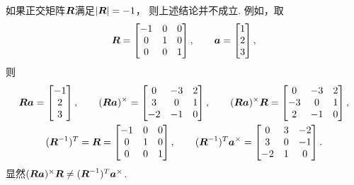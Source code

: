 \begin{remark}
如果正交矩阵\(\boldsymbol{R}\)满足\(\abs{\boldsymbol{R}} = -1\)，
则上述结论并不成立.
例如，取\begin{equation*}
	\boldsymbol{R}
	= \begin{bmatrix}
		-1 & 0 & 0 \\
		0 & 1 & 0 \\
		0 & 0 & 1
	\end{bmatrix},
	\qquad
	\boldsymbol{a}
	= \begin{bmatrix}
		1 \\
		2 \\
		3
	\end{bmatrix},
\end{equation*}
则\begin{gather*}
	\boldsymbol{R} \boldsymbol{a}
	= \begin{bmatrix}
		-1 \\ 2 \\ 3
	\end{bmatrix},
	\qquad
	(\boldsymbol{R} \boldsymbol{a})^\times
	= \begin{bmatrix}
		0 & -3 & 2 \\
		3 & 0 & 1 \\
		-2 & -1 & 0
	\end{bmatrix},
	\qquad
	(\boldsymbol{R} \boldsymbol{a})^\times \boldsymbol{R}
	= \begin{bmatrix}
		0 & -3 & 2 \\
		-3 & 0 & 1 \\
		2 & -1 & 0 \\
	\end{bmatrix},
	\\
	(\boldsymbol{R}^{-1})^T
	= \boldsymbol{R}
	= \begin{bmatrix}
		-1 & 0 & 0 \\
		0 & 1 & 0 \\
		0 & 0 & 1
	\end{bmatrix},
	\qquad
	(\boldsymbol{R}^{-1})^T \boldsymbol{a}^\times
	= \begin{bmatrix}
		0 & 3 & -2 \\
		3 & 0 & -1 \\
		-2 & 1 & 0 \\
	\end{bmatrix}.
\end{gather*}
显然\(
	(\boldsymbol{R} \boldsymbol{a})^\times \boldsymbol{R}
	\neq (\boldsymbol{R}^{-1})^T \boldsymbol{a}^\times
\).
\end{remark}

